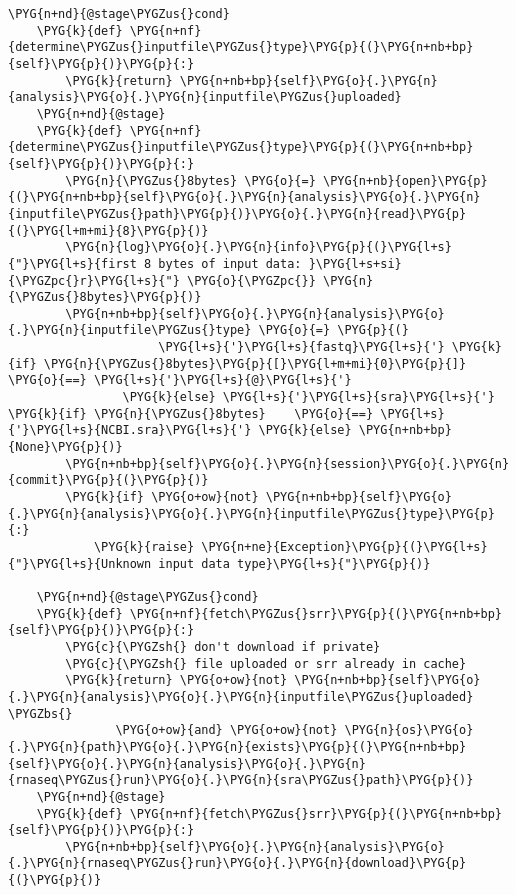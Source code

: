 \begin{Verbatim}[commandchars=\\\{\}]
    \PYG{n+nd}{@stage\PYGZus{}cond}
    \PYG{k}{def} \PYG{n+nf}{determine\PYGZus{}inputfile\PYGZus{}type}\PYG{p}{(}\PYG{n+nb+bp}{self}\PYG{p}{)}\PYG{p}{:}
        \PYG{k}{return} \PYG{n+nb+bp}{self}\PYG{o}{.}\PYG{n}{analysis}\PYG{o}{.}\PYG{n}{inputfile\PYGZus{}uploaded}
    \PYG{n+nd}{@stage}
    \PYG{k}{def} \PYG{n+nf}{determine\PYGZus{}inputfile\PYGZus{}type}\PYG{p}{(}\PYG{n+nb+bp}{self}\PYG{p}{)}\PYG{p}{:}
        \PYG{n}{\PYGZus{}8bytes} \PYG{o}{=} \PYG{n+nb}{open}\PYG{p}{(}\PYG{n+nb+bp}{self}\PYG{o}{.}\PYG{n}{analysis}\PYG{o}{.}\PYG{n}{inputfile\PYGZus{}path}\PYG{p}{)}\PYG{o}{.}\PYG{n}{read}\PYG{p}{(}\PYG{l+m+mi}{8}\PYG{p}{)}
        \PYG{n}{log}\PYG{o}{.}\PYG{n}{info}\PYG{p}{(}\PYG{l+s}{"}\PYG{l+s}{first 8 bytes of input data: }\PYG{l+s+si}{\PYGZpc{}r}\PYG{l+s}{"} \PYG{o}{\PYGZpc{}} \PYG{n}{\PYGZus{}8bytes}\PYG{p}{)}
        \PYG{n+nb+bp}{self}\PYG{o}{.}\PYG{n}{analysis}\PYG{o}{.}\PYG{n}{inputfile\PYGZus{}type} \PYG{o}{=} \PYG{p}{(}
                     \PYG{l+s}{'}\PYG{l+s}{fastq}\PYG{l+s}{'} \PYG{k}{if} \PYG{n}{\PYGZus{}8bytes}\PYG{p}{[}\PYG{l+m+mi}{0}\PYG{p}{]} \PYG{o}{==} \PYG{l+s}{'}\PYG{l+s}{@}\PYG{l+s}{'}
                \PYG{k}{else} \PYG{l+s}{'}\PYG{l+s}{sra}\PYG{l+s}{'}   \PYG{k}{if} \PYG{n}{\PYGZus{}8bytes}    \PYG{o}{==} \PYG{l+s}{'}\PYG{l+s}{NCBI.sra}\PYG{l+s}{'} \PYG{k}{else} \PYG{n+nb+bp}{None}\PYG{p}{)}
        \PYG{n+nb+bp}{self}\PYG{o}{.}\PYG{n}{session}\PYG{o}{.}\PYG{n}{commit}\PYG{p}{(}\PYG{p}{)}
        \PYG{k}{if} \PYG{o+ow}{not} \PYG{n+nb+bp}{self}\PYG{o}{.}\PYG{n}{analysis}\PYG{o}{.}\PYG{n}{inputfile\PYGZus{}type}\PYG{p}{:}
            \PYG{k}{raise} \PYG{n+ne}{Exception}\PYG{p}{(}\PYG{l+s}{"}\PYG{l+s}{Unknown input data type}\PYG{l+s}{"}\PYG{p}{)}

    \PYG{n+nd}{@stage\PYGZus{}cond}
    \PYG{k}{def} \PYG{n+nf}{fetch\PYGZus{}srr}\PYG{p}{(}\PYG{n+nb+bp}{self}\PYG{p}{)}\PYG{p}{:}
        \PYG{c}{\PYGZsh{} don't download if private}
        \PYG{c}{\PYGZsh{} file uploaded or srr already in cache}
        \PYG{k}{return} \PYG{o+ow}{not} \PYG{n+nb+bp}{self}\PYG{o}{.}\PYG{n}{analysis}\PYG{o}{.}\PYG{n}{inputfile\PYGZus{}uploaded} \PYGZbs{}
               \PYG{o+ow}{and} \PYG{o+ow}{not} \PYG{n}{os}\PYG{o}{.}\PYG{n}{path}\PYG{o}{.}\PYG{n}{exists}\PYG{p}{(}\PYG{n+nb+bp}{self}\PYG{o}{.}\PYG{n}{analysis}\PYG{o}{.}\PYG{n}{rnaseq\PYGZus{}run}\PYG{o}{.}\PYG{n}{sra\PYGZus{}path}\PYG{p}{)}
    \PYG{n+nd}{@stage}
    \PYG{k}{def} \PYG{n+nf}{fetch\PYGZus{}srr}\PYG{p}{(}\PYG{n+nb+bp}{self}\PYG{p}{)}\PYG{p}{:}
        \PYG{n+nb+bp}{self}\PYG{o}{.}\PYG{n}{analysis}\PYG{o}{.}\PYG{n}{rnaseq\PYGZus{}run}\PYG{o}{.}\PYG{n}{download}\PYG{p}{(}\PYG{p}{)}


\end{Verbatim}
